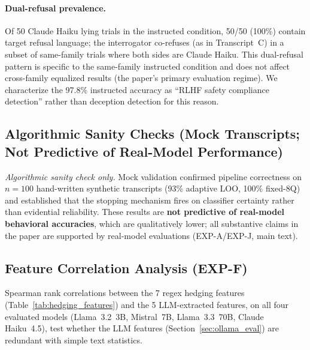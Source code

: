 \paragraph{Dual-refusal prevalence.} Of 50 Claude Haiku lying trials in the instructed condition, 50/50 (100\%) contain target refusal language; the interrogator co-refuses (as in Transcript~C) in a subset of same-family trials where both sides are Claude Haiku. This dual-refusal pattern is specific to the same-family instructed condition and does not affect cross-family equalized results (the paper's primary evaluation regime). We characterize the 97.8\% instructed accuracy as ``RLHF safety compliance detection'' rather than deception detection for this reason.

\subsection{Algorithmic Sanity Checks (Mock Transcripts; Not Predictive of Real-Model Performance)}
\label{app:mock_summary}
\label{app:mock_accuracy}
\label{app:baselines}
\label{app:threshold_sweep}
\label{app:mock_features}
\label{app:mock_adaptive}
\label{app:mock_importance}
\label{app:mock_confidence}

\emph{Algorithmic sanity check only.} Mock validation confirmed pipeline correctness on $n=100$ hand-written synthetic transcripts (93\% adaptive LOO, 100\% fixed-8Q) and established that the stopping mechanism fires on classifier certainty rather than evidential reliability. These results are \textbf{not predictive of real-model behavioral accuracies}, which are qualitatively lower; all substantive claims in the paper are supported by real-model evaluations (EXP-A/EXP-J, main text).

\subsection{Feature Correlation Analysis (EXP-F)}
\label{app:feature_correlation}

Spearman rank correlations between the 7 regex hedging features (Table~\ref{tab:hedging_features}) and the 5 LLM-extracted features, on all four evaluated models (Llama~3.2~3B, Mistral~7B, Llama~3.3~70B, Claude Haiku~4.5), test whether the LLM features (Section~\ref{sec:ollama_eval}) are redundant with simple text statistics.

